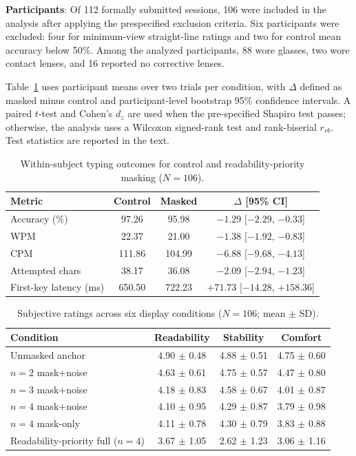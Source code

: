 \documentclass{ieeeaccess}
\begin{document}
\textbf{Participants}: Of 112 formally submitted sessions, 106 were included in the analysis after applying the prespecified exclusion criteria. Six participants were excluded: four for minimum-view straight-line ratings and two for control mean accuracy below 50\%. Among the analyzed participants, 88 wore glasses, two wore contact lenses, and 16 reported no corrective lenses.

Table~\ref{tab:study_typing} uses participant means over two trials per condition, with $\Delta$ defined as masked minus control and participant-level bootstrap 95\% confidence intervals. A paired $t$-test and Cohen's $d_z$ are used when the pre-specified Shapiro test passes; otherwise, the analysis uses a Wilcoxon signed-rank test and rank-biserial $r_{rb}$. Test statistics are reported in the text.

\begin{table}[!t]
\caption{Within-subject typing outcomes for control and readability-priority masking ($N=106$).}
\label{tab:study_typing}
\centering
\footnotesize
\setlength{\tabcolsep}{3pt}
\begin{tabular}{lccc}
\toprule
Metric & Control & Masked & $\Delta$ [95\% CI] \\
\midrule
Accuracy (\%) & 97.26 & 95.98 & $-1.29$ [$-2.29$, $-0.33$] \\
WPM & 22.37 & 21.00 & $-1.38$ [$-1.92$, $-0.83$] \\
CPM & 111.86 & 104.99 & $-6.88$ [$-9.68$, $-4.13$] \\
Attempted chars & 38.17 & 36.08 & $-2.09$ [$-2.94$, $-1.23$] \\
First-key latency (ms) & 650.50 & 722.23 & $+71.73$ [$-14.28$, $+158.36$] \\
\bottomrule
\end{tabular}
\end{table}

\begin{table}[!t]
\caption{Subjective ratings across six display conditions ($N=106$; mean $\pm$ SD).}
\label{tab:study_ratings}
\centering
\footnotesize
\setlength{\tabcolsep}{3pt}
\begin{tabular}{lccc}
\toprule
Condition & Readability & Stability & Comfort \\
\midrule
Unmasked anchor & 4.90 $\pm$ 0.48 & 4.88 $\pm$ 0.51 & 4.75 $\pm$ 0.60 \\
$n{=}2$ mask+noise & 4.63 $\pm$ 0.61 & 4.75 $\pm$ 0.57 & 4.47 $\pm$ 0.80 \\
$n{=}3$ mask+noise & 4.18 $\pm$ 0.83 & 4.58 $\pm$ 0.67 & 4.01 $\pm$ 0.87 \\
$n{=}4$ mask+noise & 4.10 $\pm$ 0.95 & 4.29 $\pm$ 0.87 & 3.79 $\pm$ 0.98 \\
$n{=}4$ mask-only & 4.11 $\pm$ 0.78 & 4.30 $\pm$ 0.79 & 3.83 $\pm$ 0.88 \\
Readability-priority full ($n{=}4$) & 3.67 $\pm$ 1.05 & 2.62 $\pm$ 1.23 & 3.06 $\pm$ 1.16 \\
\bottomrule
\end{tabular}
\end{table}
\end{document}
